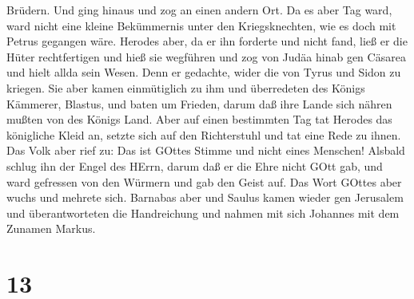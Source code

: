 Brüdern. Und ging hinaus und zog an einen andern Ort.  Da
es aber Tag ward, ward nicht eine kleine Bekümmernis unter den
Kriegsknechten, wie es doch mit Petrus gegangen wäre. 
Herodes aber, da er ihn forderte und nicht fand, ließ er die Hüter
rechtfertigen und hieß sie wegführen und zog von Judäa hinab gen Cäsarea
und hielt allda sein Wesen.  Denn er gedachte, wider die
von Tyrus und Sidon zu kriegen. Sie aber kamen einmütiglich zu ihm und
überredeten des Königs Kämmerer, Blastus, und baten um Frieden, darum
daß ihre Lande sich nähren mußten von des Königs Land. 
Aber auf einen bestimmten Tag tat Herodes das königliche Kleid an,
setzte sich auf den Richterstuhl und tat eine Rede zu ihnen.
 Das Volk aber rief zu: Das ist GOttes Stimme und nicht
eines Menschen!  Alsbald schlug ihn der Engel des HErrn,
darum daß er die Ehre nicht GOtt gab, und ward gefressen von den Würmern
und gab den Geist auf.  Das Wort GOttes aber wuchs und
mehrete sich.  Barnabas aber und Saulus kamen wieder gen
Jerusalem und überantworteten die Handreichung und nahmen mit sich
Johannes mit dem Zunamen Markus.

\hypertarget{section-12}{%
\section{13}\label{section-12}}

